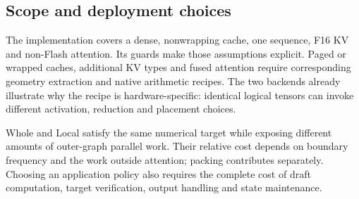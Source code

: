 \subsection{Scope and deployment choices}
The implementation covers a dense, nonwrapping cache, one sequence, F16 KV and non-Flash attention. Its guards make those assumptions explicit. Paged or wrapped caches, additional KV types and fused attention require corresponding geometry extraction and native arithmetic recipes. The two backends already illustrate why the recipe is hardware-specific: identical logical tensors can invoke different activation, reduction and placement choices.

Whole and Local satisfy the same numerical target while exposing different amounts of outer-graph parallel work. Their relative cost depends on boundary frequency and the work outside attention; packing contributes separately. Choosing an application policy also requires the complete cost of draft computation, target verification, output handling and state maintenance.
